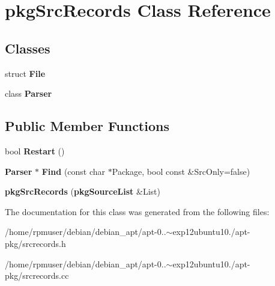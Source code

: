 \section{pkg\-Src\-Records \-Class \-Reference}
\label{classpkgSrcRecords}
\subsection*{\-Classes}
\begin{DoxyCompactItemize}
\item 
struct {\bf \-File}
\item 
class {\bf \-Parser}
\end{DoxyCompactItemize}
\subsection*{\-Public \-Member \-Functions}
\begin{DoxyCompactItemize}
\item 
bool {\bfseries \-Restart} ()\label{classpkgSrcRecords_a8a3b1b849fee6ca925d8eae8534007c7}

\item 
{\bf \-Parser} $\ast$ {\bfseries \-Find} (const char $\ast$\-Package, bool const \&\-Src\-Only=false)\label{classpkgSrcRecords_a963f3b87c05be6cf5ffe43f63b9de08f}

\item 
{\bfseries pkg\-Src\-Records} ({\bf pkg\-Source\-List} \&\-List)\label{classpkgSrcRecords_a503d94cd18bb8226bad374c8f22a9262}

\end{DoxyCompactItemize}


\-The documentation for this class was generated from the following files\-:\begin{DoxyCompactItemize}
\item 
/home/rpmuser/debian/debian\-\_\-apt/apt-\/0..$\sim$exp12ubuntu10./apt-\/pkg/srcrecords.\-h\item 
/home/rpmuser/debian/debian\-\_\-apt/apt-\/0..$\sim$exp12ubuntu10./apt-\/pkg/srcrecords.\-cc\end{DoxyCompactItemize}
